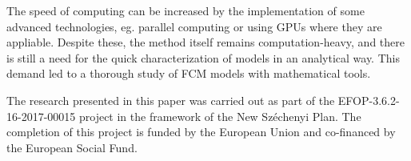 \documentclass[graybox]{svmult}
\begin{document}
The speed of computing can be increased by the implementation of some advanced technologies, eg. parallel computing or using GPUs where they are appliable. Despite these, the method itself remains computation-heavy, and there is still a need for the quick characterization of models in an analytical way. This demand led to a thorough study of FCM models with mathematical tools.

\begin{acknowledgement}
The research presented in this paper was carried out as part of the EFOP-3.6.2-16-2017-00015 project in the framework of the New Széchenyi Plan. The completion of this project is funded by the European Union and co-financed by the European Social Fund.
\end{acknowledgement}


\end{document}
